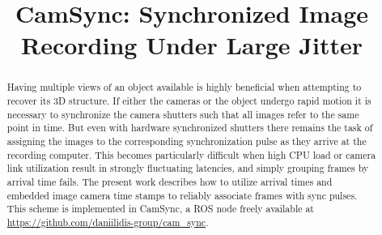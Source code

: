 \documentclass[letterpaper, 10 pt, conference]{ieeeconf}  %
\title{\LARGE \bf
CamSync: Synchronized Image Recording Under Large Jitter}
\begin{document}
\maketitle
\thispagestyle{empty}
\pagestyle{empty}

\begin{abstract}
Having multiple views of an object available is highly beneficial
when attempting to recover its 3D structure. If either the cameras or
the object undergo rapid motion it is necessary to synchronize the
camera shutters such that all images refer to the same point in time.
But even with hardware synchronized shutters there remains the
task of assigning the images to the corresponding synchronization
pulse as they arrive at the recording computer. This becomes
particularly difficult when high CPU load or camera link utilization
result in strongly fluctuating latencies, and simply grouping
frames by arrival time fails.
The present work describes how to utilize arrival times and embedded
image camera time stamps to reliably associate frames with sync
pulses. This scheme is implemented in CamSync, a ROS node freely available at
\href{https://github.com/daniilidis-group/cam_sync}{https://github.com/daniilidis-group/cam\_sync}.
\end{abstract}










\end{document}
